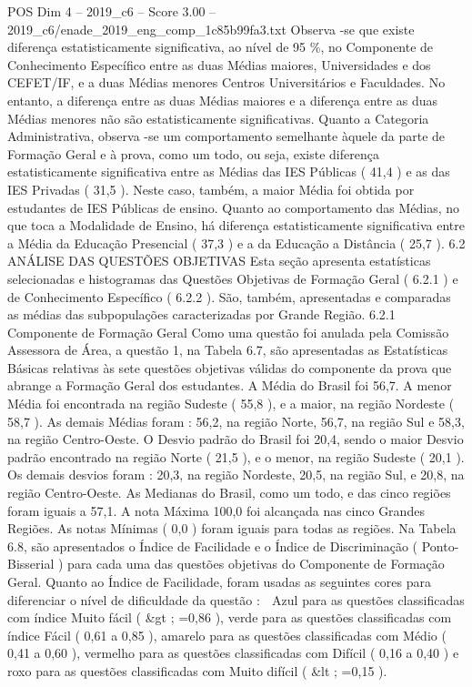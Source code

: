 \begin{textsample}{POS Dim 4 – 2019\_c6 – Score 3.00 – 2019\_c6/enade\_2019\_eng\_comp\_1c85b99fa3.txt}
Observa -se que existe diferença estatisticamente significativa, ao nível de 95 \%, no Componente de Conhecimento Específico entre as duas Médias maiores, Universidades e dos CEFET/IF, e a duas Médias menores Centros Universitários e Faculdades.
No entanto, a diferença entre as duas Médias maiores e a diferença entre as duas Médias menores não são estatisticamente significativas.
Quanto a Categoria Administrativa, observa -se um comportamento semelhante àquele da parte de Formação Geral e à prova, como um todo, ou seja, existe diferença estatisticamente significativa entre as Médias das IES Públicas ( 41,4 ) e as das IES Privadas ( 31,5 ).
Neste caso, também, a maior Média foi obtida por estudantes de IES Públicas de ensino.
Quanto ao comportamento das Médias, no que toca a Modalidade de Ensino, há diferença estatisticamente significativa entre a Média da Educação Presencial ( 37,3 ) e a da Educação a Distância ( 25,7 ). 6.2 ANÁLISE DAS QUESTÕES OBJETIVAS Esta seção apresenta estatísticas selecionadas e histogramas das Questões Objetivas de Formação Geral ( 6.2.1 ) e de Conhecimento Específico ( 6.2.2 ).
São, também, apresentadas e comparadas as médias das subpopulações caracterizadas por Grande Região. 6.2.1 Componente de Formação Geral Como uma questão foi anulada pela Comissão Assessora de Área, a questão 1, na Tabela 6.7, são apresentadas as Estatísticas Básicas relativas às sete questões objetivas válidas do componente da prova que abrange a Formação Geral dos estudantes.
A Média do Brasil foi 56,7.
A menor Média foi encontrada na região Sudeste ( 55,8 ), e a maior, na região Nordeste ( 58,7 ).
As demais Médias foram : 56,2, na região Norte, 56,7, na região Sul e 58,3, na região Centro-Oeste.
O Desvio padrão do Brasil foi 20,4, sendo o maior Desvio padrão encontrado na região Norte ( 21,5 ), e o menor, na região Sudeste ( 20,1 ).
Os demais desvios foram : 20,3, na região Nordeste, 20,5, na região Sul, e 20,8, na região Centro-Oeste.
As Medianas do Brasil, como um todo, e das cinco regiões foram iguais a 57,1.
A nota Máxima 100,0 foi alcançada nas cinco Grandes Regiões.
As notas Mínimas ( 0,0 ) foram iguais para todas as regiões.
Na Tabela 6.8, são apresentados o Índice de Facilidade e o Índice de Discriminação ( Ponto-Bisserial ) para cada uma das questões objetivas do Componente de Formação Geral.
Quanto ao Índice de Facilidade, foram usadas as seguintes cores para diferenciar o nível de dificuldade da questão :  Azul para as questões classificadas com índice Muito fácil ( \&gt ; =0,86 ), verde para as questões classificadas com índice Fácil ( 0,61 a 0,85 ), amarelo para as questões classificadas com Médio ( 0,41 a 0,60 ), vermelho para as questões classificadas com Difícil ( 0,16 a 0,40 ) e roxo para as questões classificadas com Muito difícil ( \&lt ; =0,15 ).

\end{textsample}
